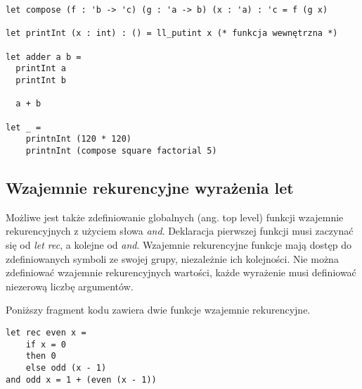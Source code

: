\documentclass[declaration,shortabstract]{iithesis}
\begin{document}
\begin{lstlisting}[frame=lines]
let compose (f : 'b -> 'c) (g : 'a -> b) (x : 'a) : 'c = f (g x)

let printInt (x : int) : () = ll_putint x (* funkcja wewnętrzna *)

let adder a b = 
  printInt a 
  printInt b 

  a + b

let _ = 
    printnInt (120 * 120)
    printnInt (compose square factorial 5)
\end{lstlisting}




\subsection{Wzajemnie rekurencyjne wyrażenia let}

Możliwe jest także zdefiniowanie globalnych (ang. top level) funkcji wzajemnie 
rekurencyjnych z użyciem słowa \textit{and}. Deklaracja pierwszej funkcji 
musi zaczynać się od \textit{let rec}, a kolejne od \textit{and}. Wzajemnie 
rekurencyjne funkcje mają dostęp do zdefiniowanych symboli ze swojej grupy,
niezależnie ich kolejności. Nie można zdefiniować wzajemnie rekurencyjnych 
wartości, każde wyrażenie musi definiować niezerową liczbę argumentów.

Poniższy fragment kodu zawiera dwie funkcje wzajemnie rekurencyjne.

\begin{lstlisting}[frame=lines]
let rec even x = 
    if x = 0
    then 0
    else odd (x - 1)
and odd x = 1 + (even (x - 1))
\end{lstlisting}



\end{document}
